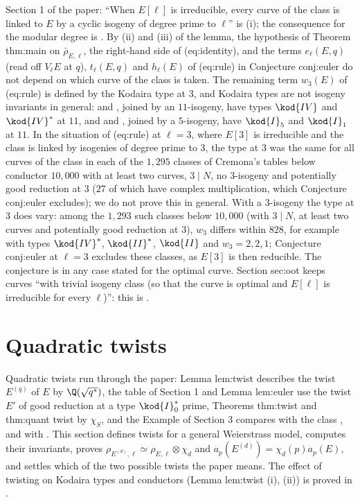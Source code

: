 \begin{paperlink}\label{pl:ellcurves:optimal}
Section 1 of the paper: ``When $E[\ell]$ is irreducible, every curve of the class is linked to $E$ by a cyclic isogeny of degree prime to $\ell$'' is
(i); the consequence for the modular degree is . By (ii) and (iii) of the lemma, the hypothesis of Theorem thm:main on $\bar\rho_{E,\ell}$, the right-hand side of (eq:identity), and
the terms $e_\ell(E,q)$ (read off $V_\ell E$ at $q$), $t_\ell(E,q)$ and $h_\ell(E)$ of (eq:rule) in Conjecture conj:euler do not depend on which curve of the class is taken. The
remaining term $w_3(E)$ of (eq:rule) is defined by the Kodaira type at $3$, and Kodaira types are not isogeny invariants in general:  and ,
joined by an $11$-isogeny, have types $\kod{IV}$ and $\kod{IV}^*$ at $11$, and  and , joined by a $5$-isogeny, have $\kod{I}_5$ and $\kod{I}_1$ at
$11$. In the situation of (eq:rule) at $\ell=3$, where $E[3]$ is irreducible and the class is linked by isogenies of degree prime to $3$, the type at $3$ was the same for all
curves of the class in each of the $1{,}295$ classes of Cremona's tables below conductor $10{,}000$ with at least two curves, $3\mid N$, no $3$-isogeny and potentially good
reduction at $3$ ($27$ of which have complex multiplication, which Conjecture conj:euler excludes); we do not prove this in general.
With a $3$-isogeny the type at $3$ does vary: among the $1{,}293$ such classes below $10{,}000$ (with $3\mid N$, at least two curves and potentially good
reduction at $3$), $w_3$ differs within $828$, for example  with types $\kod{IV}^*$, $\kod{II}^*$, $\kod{II}$ and $w_3=2,2,1$; Conjecture conj:euler at $\ell=3$
excludes these classes, as $E[3]$ is then reducible. The conjecture is in any case stated for the optimal curve. Section sec:oot keeps curves ``with trivial isogeny class (so that the curve is optimal and $E[\ell]$
is irreducible for every $\ell$)'': this is .
\end{paperlink}

\section{Quadratic twists}\label{sec:ellcurves:twists}

Quadratic twists run through the paper: Lemma lem:twist describes the twist $E^{(q)}$ of $E$ by $\Q(\sqrt{q^*})$, the table of Section 1 and Lemma lem:euler use the twist $E'$ of good reduction at a
type $\kod{I}_0^*$ prime, Theorems thm:twist and thm:quant twist by $\chi_S$, and the Example of Section 3 compares  with the class , and  with . This
section defines twists for a general Weierstrass model, computes their invariants, proves $\rho_{E^{(d)},\ell}\simeq\rho_{E,\ell}\otimes\chi_d$ and $a_p(E^{(d)})=\chi_d(p)a_p(E)$, and settles which of
the two possible twists the paper means. The effect of twisting on Kodaira types and conductors (Lemma lem:twist (i), (ii)) is proved in .

